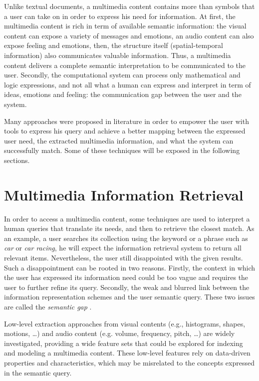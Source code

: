 
	Unlike textual documents, a multimedia content contains more than symbols that a user can take on 
	in order to express his need for information. At first, the multimedia content is rich in term 
	of available semantic information: the visual content can expose a variety of messages and emotions, 
	an audio content can also expose feeling and emotions, then, the structure itself 
	(spatial-temporal information) also communicates valuable information. Thus, a multimedia content 
	delivers a complete semantic interpretation to be communicated to the user. Secondly, the computational 
	system can process only mathematical and logic expressions, and not all what a human can express 
	and interpret in term of ideas, emotions and feeling: the communication gap between the user and the system.

	Many approaches were proposed in literature in order to empower the user with tools to express 
	his query and achieve a better mapping between the expressed user need, the extracted 
	multimedia information, and what the system can  successfully match. Some of these techniques 
	will be exposed in the following sections.

	\section{Multimedia Information Retrieval}

	In order to access a multimedia content, some techniques are used to interpret a
	human queries that translate its needs, and then to retrieve the closest match. 
	As an example, a user searches its collection using the keyword or a phrase such 
	as \emph{car} or \emph{car racing}, he will expect the information retrieval system 
	to return all relevant items. Nevertheless, the user still disappointed with the given 
	results. Such a disappointment can be rooted in two reasons. Firstly, the context in 
	which the user has expressed its information need could be too vague and requires the user
	to further refine its query. Secondly, the weak and blurred link between the information
	representation schemes and the user semantic query. These two issues are called the
	\emph{semantic gap} \citep{Smeulders2000,Bahmanyar2015}.

	Low-level extraction approaches from visual contents (e.g., histograms, shapes, motions, \dots)
	and audio content (e.g. volume, frequency, pitch, …) are widely investigated, providing a wide 
	feature sets that could be explored for indexing and modeling a multimedia content. These low-level 
	features rely on data-driven properties and characteristics, which may be misrelated to the concepts 
	expressed in the semantic query.

